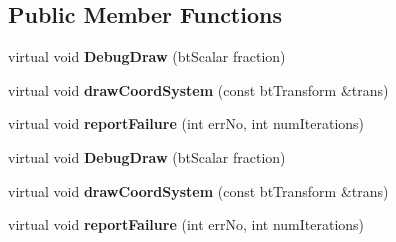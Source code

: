 \subsection*{Public Member Functions}
\begin{DoxyCompactItemize}
\item 
\mbox{\label{structbtConvexCast_1_1CastResult_afebcf038c88ef123c0570d5ab79cb3c6}} 
virtual void {\bfseries Debug\+Draw} (bt\+Scalar fraction)
\item 
\mbox{\label{structbtConvexCast_1_1CastResult_afd262451a525bb528a1b6ae9cff66f03}} 
virtual void {\bfseries draw\+Coord\+System} (const bt\+Transform \&trans)
\item 
\mbox{\label{structbtConvexCast_1_1CastResult_aabe1caaf55dc1dbe884cb0c188de12da}} 
virtual void {\bfseries report\+Failure} (int err\+No, int num\+Iterations)
\item 
\mbox{\label{structbtConvexCast_1_1CastResult_afebcf038c88ef123c0570d5ab79cb3c6}} 
virtual void {\bfseries Debug\+Draw} (bt\+Scalar fraction)
\item 
\mbox{\label{structbtConvexCast_1_1CastResult_afd262451a525bb528a1b6ae9cff66f03}} 
virtual void {\bfseries draw\+Coord\+System} (const bt\+Transform \&trans)
\item 
\mbox{\label{structbtConvexCast_1_1CastResult_aabe1caaf55dc1dbe884cb0c188de12da}} 
virtual void {\bfseries report\+Failure} (int err\+No, int num\+Iterations)
\end{DoxyCompactItemize}
